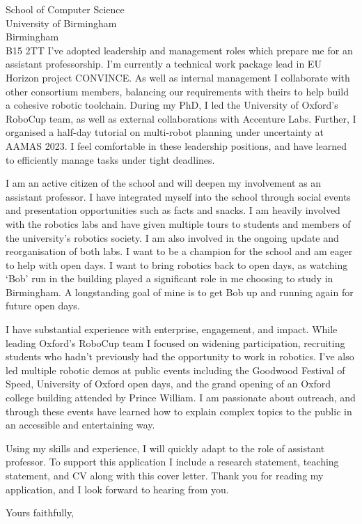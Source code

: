 \documentclass[12pt]{letter}
\begin{document}
\begin{letter}{School of Computer Science \\ University of Birmingham \\ Birmingham \\ B15 2TT}
I've adopted leadership and management roles which prepare me for an assistant professorship.
%
I'm currently a technical work package lead in EU Horizon project CONVINCE.
%
As well as internal management I collaborate with other consortium members, balancing our requirements with theirs to help build a cohesive robotic toolchain.
%
During my PhD, I led the University of Oxford's RoboCup team, as well as external collaborations with Accenture Labs.
%
Further, I organised a half-day tutorial on multi-robot planning under uncertainty at AAMAS 2023.
%
I feel comfortable in these leadership positions, and have learned to efficiently manage tasks under tight deadlines.

I am an active citizen of the school and will deepen my involvement as an assistant professor.
%
I have integrated myself into the school through social events and presentation opportunities such as facts and snacks.
%
I am heavily involved with the robotics labs and have given multiple tours to students and members of the university's robotics society.
%
I am also involved in the ongoing update and reorganisation of both labs.
%
I want to be a champion for the school and am eager to help with open days.
%
I want to bring robotics back to open days, as watching `Bob' run in the building played a significant role in me choosing to study in Birmingham.
%
A longstanding goal of mine is to get Bob up and running again for future open days.


I have substantial experience with enterprise, engagement, and impact.
%
While leading Oxford's RoboCup team I focused on widening participation, recruiting students who hadn't previously had the opportunity to work in robotics.
%
I've also led multiple robotic demos at public events including the Goodwood Festival of Speed, University of Oxford open days, and the grand opening of an Oxford college building attended by Prince William.
%
I am passionate about outreach, and through these events have learned how to explain complex topics to the public in an accessible and entertaining way.


Using my skills and experience, I will quickly adapt to the role of assistant professor.
%
To support this application I include a research statement, teaching statement, and CV along with this cover letter.
%
Thank you for reading my application, and I look forward to hearing from you.

\closing{\vspace{30pt} Yours faithfully,}
\end{letter}
\end{document}

